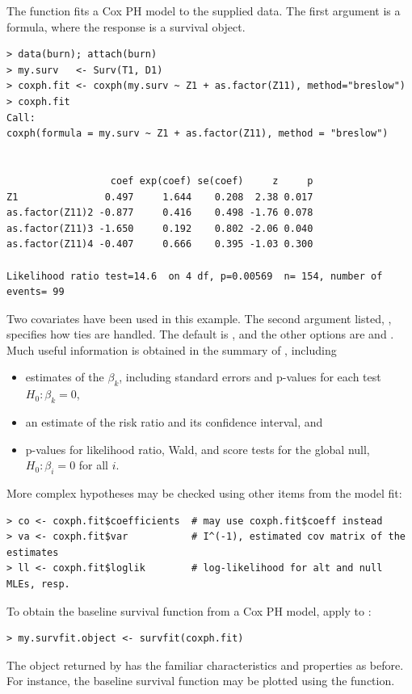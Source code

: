 \documentclass[11pt]{article}
\begin{document}
The function  fits a Cox PH model to the supplied data. The first argument is a formula, where the response is a survival object. %
{\color{verbatimrcom}\begin{verbatim}
> data(burn); attach(burn)
> my.surv   <- Surv(T1, D1)
> coxph.fit <- coxph(my.surv ~ Z1 + as.factor(Z11), method="breslow")
> coxph.fit
Call:
coxph(formula = my.surv ~ Z1 + as.factor(Z11), method = "breslow")


                  coef exp(coef) se(coef)     z     p
Z1               0.497     1.644    0.208  2.38 0.017
as.factor(Z11)2 -0.877     0.416    0.498 -1.76 0.078
as.factor(Z11)3 -1.650     0.192    0.802 -2.06 0.040
as.factor(Z11)4 -0.407     0.666    0.395 -1.03 0.300

Likelihood ratio test=14.6  on 4 df, p=0.00569  n= 154, number of events= 99 
\end{verbatim}}
Two covariates have been used in this example. The second argument listed, , specifies how ties are handled. The default is , and the other options are  and . Much useful information is obtained in the summary of , including
\begin{itemize}
\item estimates of the $\beta_k$, including standard errors and p-values for each test $H_0: \beta_k=0$, %
\item an estimate of the risk ratio and its confidence interval, and
\item p-values for likelihood ratio, Wald, and score tests for the global null, $H_0: \beta_i =0$ for all $i$.
\end{itemize}
More complex hypotheses may be checked using other items from the model fit:
{\color{verbatimrcom}\begin{verbatim}
> co <- coxph.fit$coefficients  # may use coxph.fit$coeff instead
> va <- coxph.fit$var           # I^(-1), estimated cov matrix of the estimates
> ll <- coxph.fit$loglik        # log-likelihood for alt and null MLEs, resp.
\end{verbatim}}
To obtain the baseline survival function from a Cox PH model, apply  to :{\color{verbatimrcom}\begin{verbatim}
> my.survfit.object <- survfit(coxph.fit)
\end{verbatim}}
The object returned by  has the familiar characteristics and properties as before. For instance, the baseline survival function may be plotted using the  function.
\end{document}
